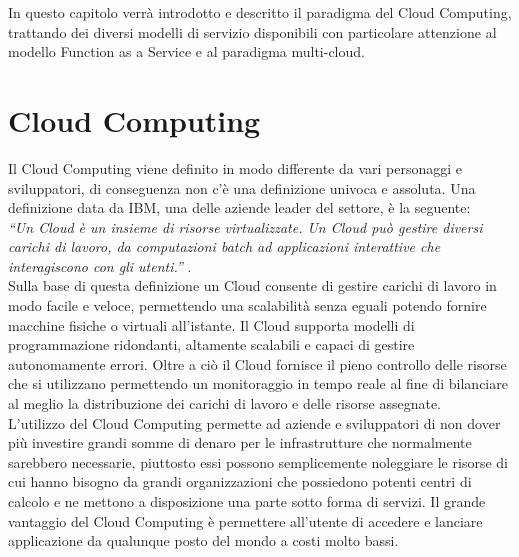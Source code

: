 In questo capitolo verrà introdotto e descritto il paradigma del Cloud Computing, trattando dei diversi modelli di servizio disponibili con particolare attenzione al modello Function as a Service e al paradigma multi-cloud.

\section{Cloud Computing}
Il Cloud Computing viene definito in modo differente da vari personaggi e sviluppatori, di conseguenza non c’è una definizione univoca e assoluta. Una definizione data da IBM, una delle aziende leader del settore, è la seguente:\\
\textit{“Un Cloud è un insieme di risorse virtualizzate. Un Cloud può gestire diversi carichi di lavoro, da computazioni batch ad applicazioni interattive che interagiscono con gli utenti.”} \cite{CloudBook}.\\
Sulla base di questa definizione un Cloud consente di gestire carichi di lavoro in modo facile e veloce, permettendo una scalabilità senza eguali potendo fornire macchine fisiche o virtuali all’istante. Il Cloud supporta modelli di programmazione ridondanti, altamente scalabili e capaci di gestire autonomamente errori. Oltre a ciò il Cloud fornisce il pieno controllo delle risorse che si utilizzano permettendo un monitoraggio in tempo reale al fine di bilanciare al meglio la distribuzione dei carichi di lavoro e delle risorse assegnate. \\
L’utilizzo del Cloud Computing permette ad aziende e sviluppatori di non dover più investire grandi somme di denaro per le infrastrutture che normalmente sarebbero necessarie, piuttosto essi possono semplicemente noleggiare le risorse di cui hanno bisogno da grandi organizzazioni che possiedono potenti centri di calcolo e ne mettono a disposizione una parte sotto forma di servizi. Il grande vantaggio del Cloud Computing è permettere all’utente di accedere e lanciare applicazione da qualunque posto del mondo a costi molto bassi. \\

